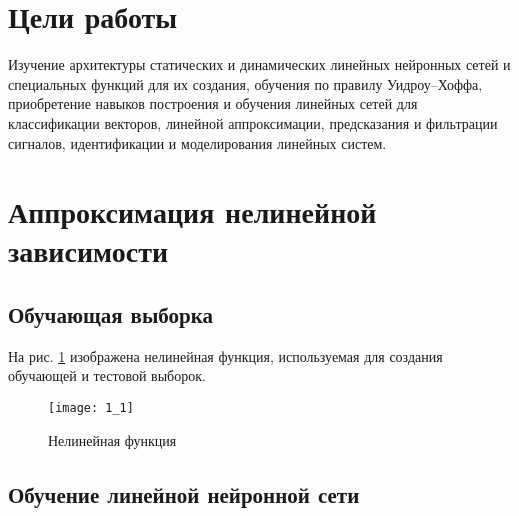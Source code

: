 





\tableofcontents
\listoffigures
\newpage

\section{Цели работы}

Изучение архитектуры статических и динамических линейных нейронных сетей и специальных функций для их создания, обучения по правилу Уидроу–Хоффа, приобретение навыков построения и обучения линейных сетей для классификации векторов, линейной аппроксимации, предсказания и фильтрации сигналов, идентификации и моделирования линейных систем.

\section{Аппроксимация нелинейной зависимости}

\subsection{Обучающая выборка}


На рис. \ref{fig:1_1} изображена нелинейная функция, используемая для создания обучающей и тестовой выборок.

\begin{figure}[H]
\begin{center}
	\texttt{[image: 1\_1]}
	\caption{Нелинейная функция}
	\label{fig:1_1}
\end{center}
\end{figure}

\newpage

\subsection{Обучение линейной нейронной сети}


